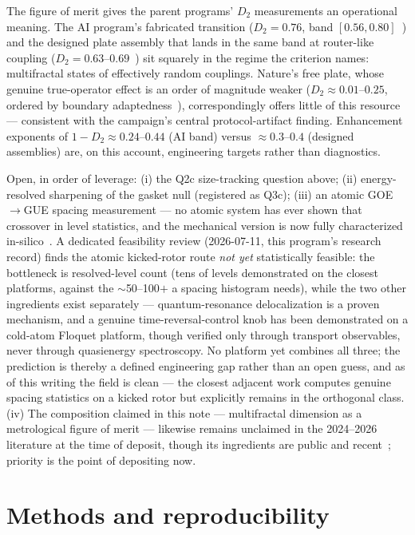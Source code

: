 \documentclass[11pt]{article}
\begin{document}
The figure of merit gives the parent programs' $D_2$ measurements an operational meaning.
The AI program's fabricated transition ($D_2 = 0.76$, band $[0.56,0.80]$~\cite{ornelas2026rmt})
and the designed plate assembly that lands in the same band at router-like coupling
($D_2 = 0.63$--$0.69$~\cite{ornelas2026fem}) sit squarely in the regime the criterion names:
multifractal states of effectively random couplings. Nature's free plate, whose genuine
true-operator effect is an order of magnitude weaker ($D_2 \approx 0.01$--$0.25$, ordered by
boundary adaptedness~\cite{ornelas2026fem}), correspondingly offers little of this resource ---
consistent with the campaign's central protocol-artifact finding. Enhancement exponents of
$1-D_2 \approx 0.24$--$0.44$ (AI band) versus $\approx 0.3$--$0.4$ (designed assemblies) are, on
this account, engineering targets rather than diagnostics.

Open, in order of leverage: (i) the Q2c size-tracking question above; (ii) energy-resolved
sharpening of the gasket null (registered as Q3c); (iii) an atomic GOE$\to$GUE spacing
measurement --- no atomic system has ever shown that crossover in level statistics, and the
mechanical version is now fully characterized in-silico~\cite{ornelas2026fem}. A dedicated
feasibility review (2026-07-11, this program's research record) finds the atomic kicked-rotor
route \emph{not yet} statistically feasible: the bottleneck is resolved-level count (tens of
levels demonstrated on the closest platforms, against the $\sim$50--100$+$ a spacing histogram
needs), while the two other ingredients exist separately --- quantum-resonance delocalization is
a proven mechanism, and a genuine time-reversal-control knob has been demonstrated on a cold-atom
Floquet platform, though verified only through transport observables, never through quasienergy
spectroscopy. No platform yet combines all three; the prediction is thereby a defined engineering
gap rather than an open guess, and as of this writing the field is clean --- the closest adjacent
work computes genuine spacing statistics on a kicked rotor but explicitly remains in the
orthogonal class. (iv) The composition claimed in this note --- multifractal dimension as a
metrological figure of merit --- likewise remains unclaimed in the 2024--2026 literature at the
time of deposit, though its ingredients are public and recent~\cite{sak2022,hu2026}; priority is
the point of depositing now.

\section{Methods and reproducibility}
\label{sec:methods}
\end{document}
